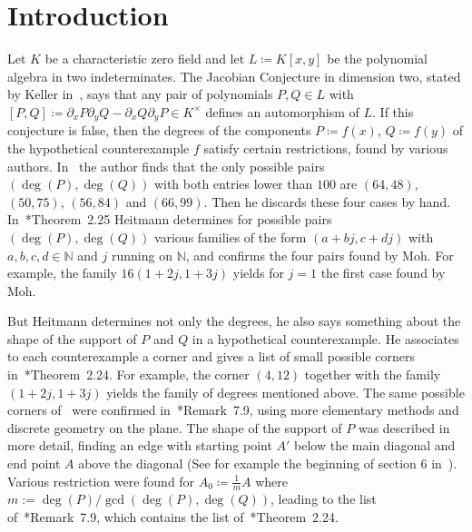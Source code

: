 \documentclass[reqno,a4paper]{amsart}
\theoremstyle{definition}
\theoremstyle{remark}
\DeclareMathOperator{\HH}{H}
\begin{document}
\begin{abstract}
We prove that if the Jacobian Conjecture in two variables is false and $(P,Q)$ is a standard minimal pair, then the Newton polygon $\HH(P)$ of $P$ must satisfy several restrictions that had not been found previously. This allows us to discard some of the corners found in~\cite{GGV}*{Remark~7.9} for $\HH(P)$, together with some of the infinite families found in~\cite{H}*{Theorem~2.25}.
\end{abstract}

\maketitle


\section*{Introduction}


Let $K$ be a characteristic zero field and let $L\coloneqq K[x,y]$ be the polynomial algebra in two indeterminates. The Jacobian Conjecture in dimension two, stated by Keller in~\cite{K}, says that any pair of polynomials $P,Q\in L$ with $[P,Q]\coloneqq \partial_x P \partial_y Q - \partial_x Q \partial_y P\in K^{\times}$ defines an automorphism of $L$. If this conjecture is false, then the degrees of the components $P\coloneqq f(x)$, $Q\coloneqq f(y)$ of the hypothetical counterexample $f$ satisfy certain restrictions, found by various authors. In~\cite{M} the author finds that the only possible pairs $(\deg(P),\deg(Q))$ with both entries lower than $100$ are $(64,48)$, $(50,75)$, $(56,84)$ and $(66,99)$. Then he discards these four cases by hand. In~\cite{H}*{Theorem~2.25} Heitmann determines for  possible pairs $(\deg(P),\deg(Q))$ various families of the form $(a+bj,c+dj)$ with $a,b,c,d\in\mathds{N}$ and $j$ running on $\mathds{N}$, and confirms the four pairs found by Moh. For example, the family $16(1+2j,1+3j)$ yields for $j=1$ the first case found by Moh.

But Heitmann determines not only the degrees, he also says something about the shape of the support of $P$ and $Q$ in a hypothetical counterexample. He associates to each counterexample a corner and gives a list of small possible corners in~\cite{H}*{Theorem~2.24}. For example, the corner $(4,12)$ together with the family $(1+2j,1+3j)$ yields the family of degrees mentioned above. The same possible corners of~\cite{H} were confirmed in~\cite{GGV}*{Remark~7.9}, using more elementary methods and discrete geometry on the plane. The shape of the support of $P$ was described in more detail, finding an edge with starting point $A'$ below the main diagonal and end point $A$ above the diagonal (See for example the beginning of section 6 in~\cite{GGV}). Various restriction were found for $A_0\coloneqq \frac{1}{m} A$ where $m:=\deg(P)/\gcd(\deg(P),\deg(Q))$, leading to the list of~\cite{GGV}*{Remark~7.9}, which contains the list of~\cite{H}*{Theorem~2.24}.
\end{document}
